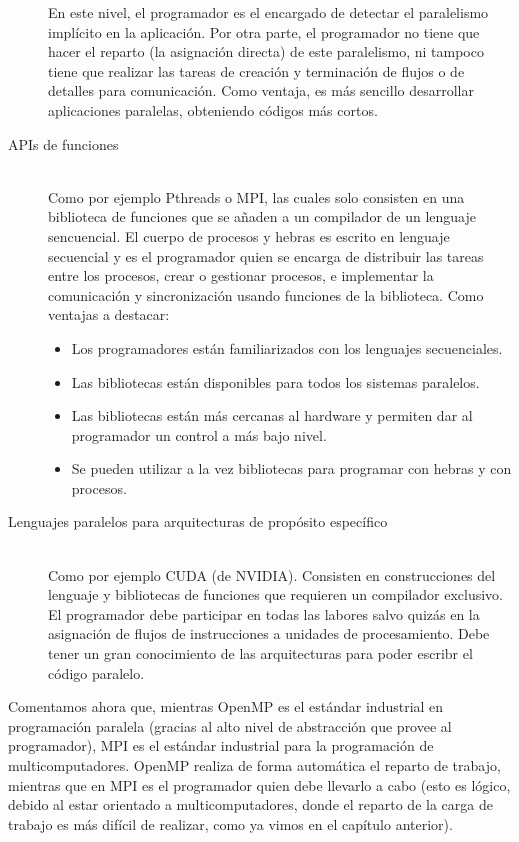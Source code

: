 \begin{description}
        En este nivel, el programador es el encargado de detectar el paralelismo implícito en la aplicación. Por otra parte, el programador no tiene que hacer el reparto (la asignación directa) de este paralelismo, ni tampoco tiene que realizar las tareas de creación y terminación de flujos o de detalles para comunicación. Como ventaja, es más sencillo desarrollar aplicaciones paralelas, obteniendo códigos más cortos.
    \item [APIs de funciones]~\\
        Como por ejemplo Pthreads o MPI, las cuales solo consisten en una biblioteca de funciones que se añaden a un compilador de un lenguaje sencuencial. El cuerpo de procesos y hebras es escrito en lenguaje secuencial y es el programador quien se encarga de distribuir las tareas entre los procesos, crear o gestionar procesos, e implementar la comunicación y sincronización usando funciones de la biblioteca. Como ventajas a destacar:
        \begin{itemize}
            \item Los programadores están familiarizados con los lenguajes secuenciales.
            \item Las bibliotecas están disponibles para todos los sistemas paralelos.
            \item Las bibliotecas están más cercanas al hardware y permiten dar al programador un control a más bajo nivel.
            \item Se pueden utilizar a la vez bibliotecas para programar con hebras y con procesos.
        \end{itemize}
    \item [Lenguajes paralelos para arquitecturas de propósito específico]~\\
        Como por ejemplo CUDA (de NVIDIA). Consisten en construcciones del lenguaje y bibliotecas de funciones que requieren un compilador exclusivo. El programador debe participar en todas las labores salvo quizás en la asignación de flujos de instrucciones a unidades de procesamiento. Debe tener un gran conocimiento de las arquitecturas para poder escribr el código paralelo.
\end{description}

Comentamos ahora que, mientras OpenMP es el estándar industrial en programación paralela (gracias al alto nivel de abstracción que provee al programador), MPI es el estándar industrial para la programación de multicomputadores. OpenMP realiza de forma automática el reparto de trabajo, mientras que en MPI es el programador quien debe llevarlo a cabo (esto es lógico, debido al estar orientado a multicomputadores, donde el reparto de la carga de trabajo es más difícil de realizar, como ya vimos en el capítulo anterior).


